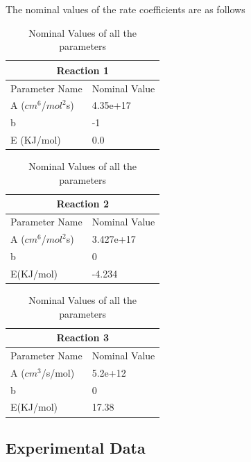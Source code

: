 The nominal values of the rate coefficients are as follows
\begin{table}[H]
  \caption {Nominal Values of all the parameters} \label{tab:nominal-data}
  \begin{center}
    \begin{tabular}{ |p{3cm}|p{3cm}|}
      \hline
      \multicolumn{2}{|c|}{Reaction 1} \\
      \hline
      Parameter Name   & Nominal Value   \\
      \hline
      A ($cm^6$/$mol^2$s)    & 4.35e+17         \\
      b      & -1       \\
      E (KJ/mol)      & 0.0   \\
      \hline
    \end{tabular}
    \begin{tabular}{ |p{3cm}|p{3cm}|}
      \hline
      \multicolumn{2}{|c|}{Reaction 2} \\
      \hline
      Parameter Name   & Nominal Value   \\
      \hline
      A ($cm^6$/$mol^2$s)     & 3.427e+17         \\
      b      & 0       \\
      E(KJ/mol)      & -4.234   \\
      \hline
    \end{tabular}
    \newline
    \vspace*{0.7 cm}
    \newline
    \begin{tabular}{ |p{3cm}|p{3cm}|}
      \hline
      \multicolumn{2}{|c|}{Reaction 3} \\
      \hline
      Parameter Name   & Nominal Value   \\
      \hline
      A ($cm^3$/s/mol)     & 5.2e+12         \\
      b      & 0       \\
      E(KJ/mol)      & 17.38   \\
      \hline
    \end{tabular}
  \end{center}
\end{table}



\subsection{Experimental Data}

